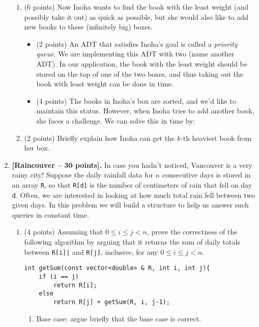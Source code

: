 \documentclass[11pt]{article}
\newcommand{\fillinblank}[1]{\fillinblankmath{\mbox{#1}}}
\newcommand{\fillinblankmath}[1]{\begingroup\setlength{\fboxsep}{1em}\setlength{\fboxrule}{2pt}\fbox{\LARGE\phantom{#1}}\endgroup}
\def\problem#1{\def\problemheading{#1}\clearpage\item{\bf #1.}}
\begin{document}
\begin{enumerate}
\begin{enumerate}
\item (6 points) Now Inoha wants to find the book with the least weight (and possibly take it out) as quick as possible, but she would also like to add new books to these (infinitely big) boxes. 
\begin{itemize}
\item (2 points) An ADT that satisfies Inoha's goal is called a {\em priority queue}. We are implementing this ADT with two (name another ADT)\fillinblank{mmmmm}. In our application, the book with the least weight should be stored on the top of one of the two boxes, and thus taking out the book with least weight can be done in \fillinblank{mmmmm} time. 
\item (4 points) The books in Inoha's box are sorted, and we'd like to maintain this status. However, when Inoha tries to add another book, she faces a challenge. We can solve this in \fillinblank{mmmmm} time by:  
\vspace{2in}
\end{itemize}

\item (2 points) Briefly explain how Inoha can get the $k$-th heaviest book from her box.
\end{enumerate}
\newpage

\problem{[Raincouver -- 30 points]}
In case you hadn't noticed, Vancouver is a very rainy city! Suppose the daily rainfall data for $n$ consecutive days is stored in an array {\tt R}, so that {\tt R[d]} is the number of centimeters of rain that fell on day {\tt d}. Often, we are interested in looking at how much total rain fell between two given days. In this problem we will build a structure to help us answer such queries in constant time. 
\begin{enumerate}

\item (4 points) Assuming that $0 \leq i \leq j< n$, prove the correctness of the following algorithm by arguing that it returns the sum of daily totals between {\tt R[i]|} and {\tt R[j]}, inclusive, for any $0 \leq i \leq j< n$.

\begin{lstlisting}
int getSum(const vector<double> & R, int i, int j){
	if (i == j)
		return R[i];
	else
		return R[j] + getSum(R, i, j-1);
\end{lstlisting}
\begin{enumerate}
	\item Base case: argue briefly that the base case is correct. 
    

\end{enumerate}
\end{enumerate}
\end{enumerate}
\end{document}
